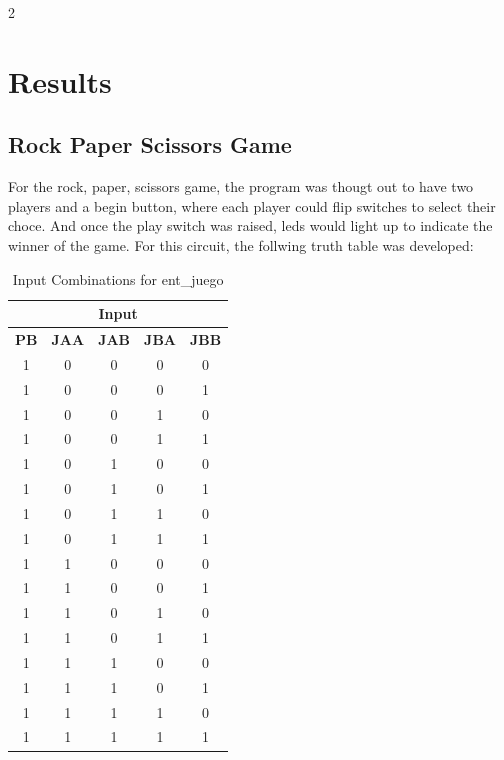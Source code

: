 \documentclass{article}
\begin{document}
\begin{multicols}{2}
\section{Results}\label{Results}

\subsection{Rock Paper Scissors Game}\label{R,P,S Game}
For the rock, paper, scissors game, the program was thougt out to have two players and a begin button, 
where each player could flip switches to select their choce. And once the play switch was raised, leds would light up to indicate
the winner of the game. For this circuit, the follwing truth table was developed:
\begin{table}[H]
\centering
\begin{tabular}{|c|c|c|c|c|}
\hline
\multicolumn{5}{|c|}{\textbf{Input}} \\
\hline
\textbf{PB} & \textbf{JAA} & \textbf{JAB} & \textbf{JBA} & \textbf{JBB} \\
\hline
1 & 0 & 0 & 0 & 0 \\
1 & 0 & 0 & 0 & 1 \\
1 & 0 & 0 & 1 & 0 \\
1 & 0 & 0 & 1 & 1 \\
1 & 0 & 1 & 0 & 0 \\
1 & 0 & 1 & 0 & 1 \\
1 & 0 & 1 & 1 & 0 \\
1 & 0 & 1 & 1 & 1 \\
1 & 1 & 0 & 0 & 0 \\
1 & 1 & 0 & 0 & 1 \\
1 & 1 & 0 & 1 & 0 \\
1 & 1 & 0 & 1 & 1 \\
1 & 1 & 1 & 0 & 0 \\
1 & 1 & 1 & 0 & 1 \\
1 & 1 & 1 & 1 & 0 \\
1 & 1 & 1 & 1 & 1 \\
\hline
\end{tabular}
\caption{Input Combinations for ent\_juego}
\label{tab:vhdl_juego_inputs}
\end{table}


\end{multicols}
\end{document}
